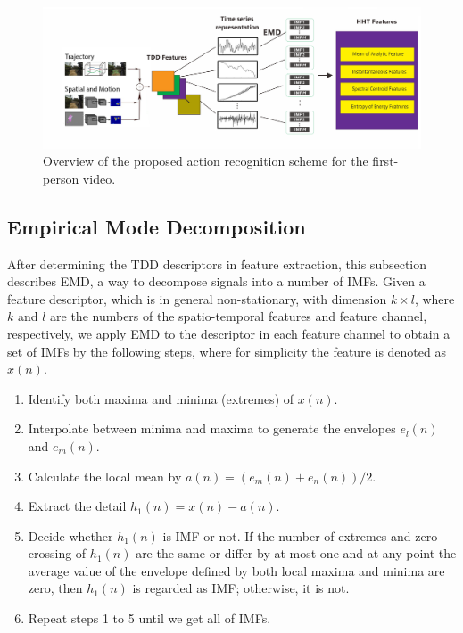 \begin{figure}[!t]
\centering
\includegraphics[width=1\textwidth]{figures/framework}
\caption{Overview of the proposed action recognition scheme for the first-person video.
} 
\label{fig:framework}
\end{figure}

\subsection{Empirical Mode Decomposition}

After determining the TDD descriptors in feature extraction,
this subsection describes EMD, a way to decompose signals into a
number of IMFs. Given a feature descriptor, which is in general
non-stationary, with dimension  $k \times l$, where $k$ and $l$ are
the numbers of the spatio-temporal features and  feature channel,
respectively, we apply EMD to the descriptor in each feature channel
to obtain a set of IMFs by the following steps, where for simplicity
the feature is denoted as $x(n)$.
\begin{enumerate}
    \item Identify both maxima and minima (extremes) of  $x(n)$.
    \item Interpolate between minima and maxima to generate the envelopes  $e_{l}(n)$ and $e_{m}(n)$.
    \item Calculate the local mean by  $a(n)=(e_{m}(n)+e_{n}(n))/2$.
    \item Extract the detail  $h_{1}(n) = x(n) - a(n)$.
    \item Decide whether $h_{1}(n)$ is IMF or not. If the number of extremes and zero crossing of  $h_{1}(n)$ are the same or differ by at most one and at any point the average value of the envelope defined by both local maxima and minima are zero, then  $h_{1}(n)$  is regarded as IMF; otherwise, it is not.
    \item Repeat steps 1 to 5 until we get all of IMFs.
\end{enumerate}

